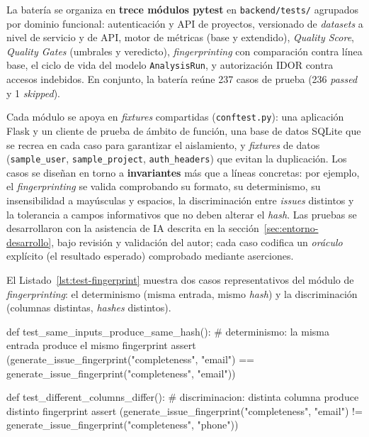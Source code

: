 La batería se organiza en \textbf{trece módulos pytest} en
\texttt{backend/tests/} agrupados por dominio funcional: autenticación
y \ac{API} de proyectos, versionado de \emph{datasets} a nivel de
servicio y de \ac{API}, motor de métricas (base y extendido),
\emph{Quality Score}, \emph{Quality Gates} (umbrales y veredicto),
\emph{fingerprinting} con comparación contra línea base, el ciclo de vida
del modelo \texttt{AnalysisRun}, y autorización \ac{IDOR} contra accesos
indebidos.  En conjunto, la batería reúne 237 casos de prueba (236
\emph{passed} y 1 \emph{skipped}).

Cada módulo se apoya en \emph{fixtures} compartidas (\texttt{conftest.py}):
una aplicación Flask y un cliente de prueba de ámbito de función, una base
de datos SQLite que se recrea en cada caso para garantizar el aislamiento, y
\emph{fixtures} de datos (\texttt{sample\_user}, \texttt{sample\_project},
\texttt{auth\_headers}) que evitan la duplicación.  Los casos se diseñan en
torno a \textbf{invariantes} más que a líneas concretas: por ejemplo, el
\emph{fingerprinting} se valida comprobando su formato, su determinismo, su
insensibilidad a mayúsculas y espacios, la discriminación entre \emph{issues}
distintos y la tolerancia a campos informativos que no deben alterar el
\emph{hash}.  Las pruebas se desarrollaron con la asistencia de \ac{IA}
descrita en la sección~\ref{sec:entorno-desarrollo}, bajo revisión y
validación del autor; cada caso codifica un \emph{oráculo} explícito (el
resultado esperado) comprobado mediante aserciones.

El Listado~\ref{lst:test-fingerprint} muestra dos casos representativos del
módulo de \emph{fingerprinting}: el determinismo (misma entrada, mismo
\emph{hash}) y la discriminación (columnas distintas, \emph{hashes} distintos).

\begin{listing}[language=Python,float=!t,caption={Pruebas de determinismo y discriminación del \emph{fingerprinting}},label={lst:test-fingerprint}]
def test_same_inputs_produce_same_hash():
    # determinismo: la misma entrada produce el mismo fingerprint
    assert (generate_issue_fingerprint("completeness", "email") ==
            generate_issue_fingerprint("completeness", "email"))

def test_different_columns_differ():
    # discriminacion: distinta columna produce distinto fingerprint
    assert (generate_issue_fingerprint("completeness", "email") !=
            generate_issue_fingerprint("completeness", "phone"))
\end{listing}

